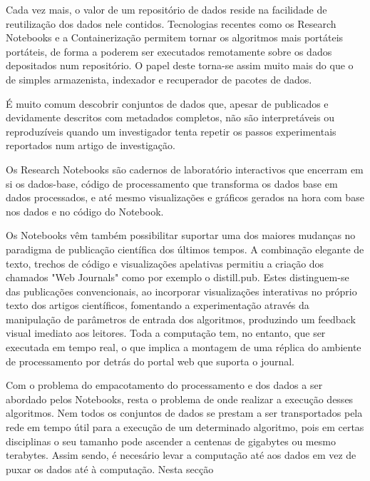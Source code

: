 \documentclass[sigconf,nonacm]{acmart}
\begin{document}
Cada vez mais, o valor de um repositório de dados reside na facilidade de reutilização dos dados nele contidos. Tecnologias recentes como os Research Notebooks e a Containerização permitem tornar os algoritmos mais portáteis portáteis, de forma a poderem ser executados remotamente sobre os dados depositados num repositório. O papel deste torna-se assim muito mais do que o de simples armazenista, indexador e recuperador de pacotes de dados.

É muito comum descobrir conjuntos de dados que, apesar de publicados e devidamente descritos com metadados completos, não são interpretáveis ou reproduzíveis quando um investigador tenta repetir os passos experimentais reportados num artigo de investigação\cite{}. 

Os Research Notebooks são cadernos de laboratório interactivos que encerram em si os dados-base, código de processamento que transforma os dados base em dados processados, e até mesmo visualizações e gráficos gerados na hora com base nos dados e no código do Notebook.

Os Notebooks vêm também possibilitar suportar uma dos maiores mudanças no paradigma de publicação científica dos últimos tempos. A combinação elegante de texto, trechos de código e visualizações apelativas permitiu a criação dos chamados "Web Journals" como por exemplo o distill.pub. Estes distinguem-se das publicações convencionais, ao incorporar visualizações interativas no próprio texto dos artigos científicos, fomentando a experimentação através da manipulação de parâmetros de entrada dos algoritmos, produzindo um feedback visual imediato aos leitores. Toda a computação tem, no entanto, que ser executada em tempo real, o que implica a montagem de uma réplica do ambiente de processamento por detrás do portal web que suporta o journal.

Com o problema do empacotamento do processamento e dos dados a ser abordado pelos Notebooks, resta o problema de onde realizar a execução desses algoritmos. Nem todos os conjuntos de dados se prestam a ser transportados pela rede em tempo útil para a execução de um determinado algoritmo, pois em certas disciplinas o seu tamanho pode ascender a centenas de gigabytes ou mesmo terabytes. Assim sendo, é necesário levar a computação até aos dados em vez de puxar os dados até à computação. Nesta secção
\end{document}

